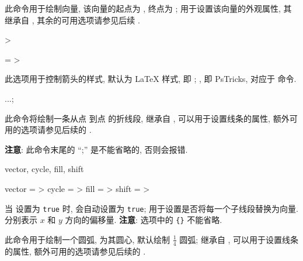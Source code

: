 \documentclass[
  hyper, 
  lang = cn, 
  class = l3doc,
  classOption={11pt},
  sect = {load=false},
]{../../zlatex/code/ztex}
\begin{document}
\begin{function}[added=2025-05-13]{\zvector}
  \begin{syntax}
     
  \end{syntax}
  此命令用于绘制向量, 该向量的起点为 , 终点为 ;
   用于设置该向量的外观属性, 其继承自 , 
  其余的可用选项请参见后续 .  
\end{function}


\begin{keyval}[parent=ztool/../vector]{>}
  \begin{syntax}
    \texttt{} = >
  \end{syntax}
  此选项用于控制箭头的样式, 默认为 \LaTeX{} 样式, 即 ; 
  , 即 PsTricks, 对应于  命令.
\end{keyval}



\begin{function}[added=2025-05-13]{\zdraw}
  \begin{syntax}
     ...;
  \end{syntax}
  此命令将绘制一条从点  到点  的折线段,  继承自 , 
  可以用于设置线条的属性, 额外可用的选项请参见后续的 .\par 
  \textbf{注意}: 此命令末尾的 ``;'' 是不能省略的, 否则会报错. 
\end{function}


\begin{keyval}[parent=ztool/../zdraw]{vector, cycle, fill, shift}
  \begin{syntax}
    vector = >
    cycle  = >
    fill   = >
    shift  = >
  \end{syntax}
  当  设置为 \texttt{true} 时,  会自动设置为 \texttt{true}; 
   用于设置是否将每一个子线段替换为向量.  分别表示 $x$ 和 $y$ 方向的偏移量. 
  \textbf{注意}:  选项中的 \texttt{\{\}} 不能省略.
\end{keyval}


\begin{function}[added=2025-05-13]{\zarc}
  \begin{syntax}
  \end{syntax}
  此命令用于绘制一个圆弧, \texttt{} 为其圆心, 默认绘制 $\frac{1}{4}$ 圆弧; 
   继承自 , 
  可以用于设置线条的属性, 额外可用的选项请参见后续的 .
\end{function}
\end{document}
